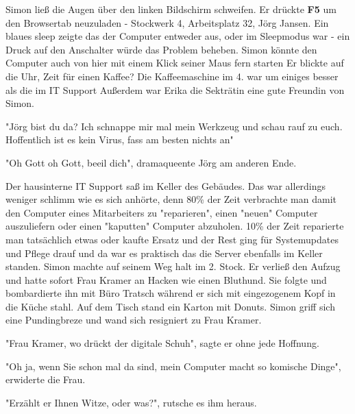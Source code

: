 \documentclass[ebook]{article}
\begin{document}
\noindent Simon ließ die Augen über den linken Bildschirm
schweifen. Er drückte \textbf{F5} um den Browsertab neuzuladen - Stockwerk
4, Arbeitsplatz 32, Jörg Jansen. Ein blaues sleep zeigte das der
Computer entweder aus, oder im Sleepmodus war - ein Druck auf den
Anschalter würde das Problem beheben. Simon könnte den Computer auch
von hier mit einem Klick seiner Maus fern starten Er blickte auf die
Uhr, Zeit für einen Kaffee? Die Kaffeemaschine im 4. war um einiges
besser als die im IT Support Außerdem war Erika die Sekträtin eine
gute Freundin von Simon.

\begin{center}
"Jörg bist du da? Ich schnappe mir mal mein Werkzeug und schau rauf
zu euch. Hoffentlich ist es kein Virus, fass am besten nichts an"
\end{center}

\begin{center}
"Oh Gott oh Gott, beeil dich", dramaqueente Jörg am anderen Ende.
\end{center}

\noindent Der hausinterne IT Support saß im Keller des Gebäudes. Das
war allerdings weniger schlimm wie es sich anhörte, denn 80\% der
Zeit verbrachte man damit den Computer eines Mitarbeiters zu
"reparieren", einen "neuen" Computer auszuliefern oder einen
"kaputten" Computer abzuholen. 10\% der Zeit reparierte man
tatsächlich etwas oder kaufte Ersatz und der Rest ging für
Systemupdates und Pflege drauf und da war es praktisch das die
Server ebenfalls im Keller standen. Simon machte auf seinem Weg halt
im 2. Stock. Er verließ den Aufzug und hatte sofort Frau Kramer an
Hacken wie einen Bluthund. Sie folgte und bombardierte ihn mit Büro
Tratsch während er sich mit eingezogenem Kopf in die Küche stahl. Auf
dem Tisch stand ein Karton mit Donuts. Simon griff sich eine
Pundingbreze und wand sich resigniert zu Frau Kramer.

\begin{center}
"Frau Kramer, wo drückt der digitale Schuh", sagte er ohne jede Hoffnung.
\end{center}

\begin{center}
"Oh ja, wenn Sie schon mal da sind, mein Computer macht so komische
Dinge", erwiderte die Frau.
\end{center}

\begin{center}
"Erzählt er Ihnen Witze, oder was?", rutsche es ihm heraus.
\end{center}
\end{document}
